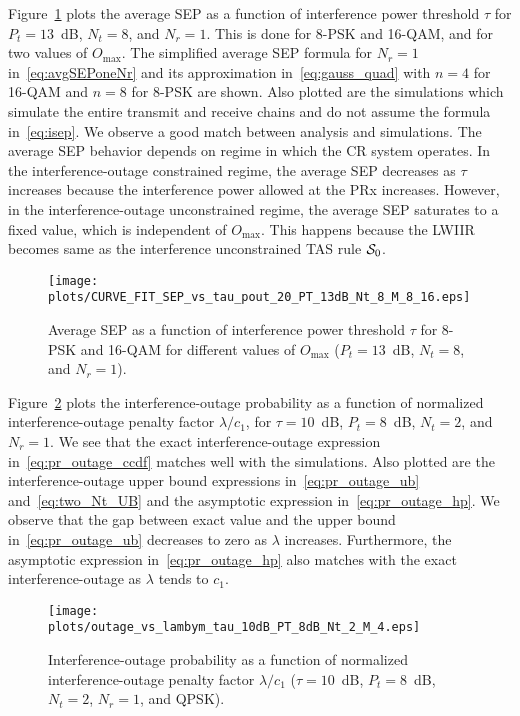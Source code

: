 \documentclass[12pt,draftcls,peerreview,onecolumn]{IEEEtran}
\newcommand{\lam}{\lambda}
\newcommand{\Nt}{{N_t}}
\newcommand{\Nr}{{N_r}}
\newcommand{\Pt}{{P_t}}
\newcommand{\outmax}{O_{\text{max}}}
\newcommand{\itau}{\tau}
\newcommand{\cone}{c_{1}}
\newcommand{\m}{\cone}
\newcommand{\caluncons}{{\cal S_{\text{0}}}}
\begin{document}
Figure~\ref{fig:SEP_vs_tau_QAM} plots the average SEP as a function of interference power threshold $\tau$ for $\Pt = 13$~dB, $\Nt=8$, and $\Nr=1$. This is done for 8-PSK and 16-QAM, and for two values of $\outmax$. The simplified average SEP formula for $\Nr=1$ in~\eqref{eq:avgSEPoneNr} and its approximation in~\eqref{eq:gauss_quad} with $n = 4$ for 16-QAM and $n=8$ for 8-PSK  are shown. Also plotted are the simulations which simulate the entire transmit and receive chains and do not assume the formula in~\eqref{eq:isep}. We observe a good match between analysis and simulations. The average SEP behavior depends on regime in which the CR system operates. In the interference-outage constrained regime, the average SEP decreases as $\itau$ increases because the interference power allowed at the PRx increases. However, in the interference-outage unconstrained regime, the average SEP saturates to a fixed value, which is independent of $\outmax$. This happens because the LWIIR becomes same as the interference unconstrained TAS rule $\caluncons$. %

\begin{figure}
	\centering \texttt{[image: plots/CURVE\_FIT\_SEP\_vs\_tau\_pout\_20\_PT\_13dB\_Nt\_8\_M\_8\_16.eps]}
	\caption{Average SEP as a function of interference power threshold $\itau$ for 8-PSK and 16-QAM for different values of $\outmax$ ($\Pt = 13$~dB, $\Nt=8$, and $\Nr=1$).}
	\label{fig:SEP_vs_tau_QAM}
\end{figure}



Figure~\ref{fig:outage_vs_lambym} plots the interference-outage probability as a function of normalized interference-outage penalty factor $\lam/\cone$,  for $\itau = 10$~dB, $\Pt = 8$~dB, $\Nt = 2$, and $\Nr=1$.  We see that the exact interference-outage expression in~\eqref{eq:pr_outage_ccdf} matches well with the simulations. Also plotted are the interference-outage upper bound expressions in~\eqref{eq:pr_outage_ub} and~\eqref{eq:two_Nt_UB} and the asymptotic expression in~\eqref{eq:pr_outage_hp}. We observe that the gap between exact value and the upper bound in~\eqref{eq:pr_outage_ub} decreases to zero as $\lam$ increases. Furthermore, the asymptotic expression in~\eqref{eq:pr_outage_hp} also matches with the exact interference-outage as $\lam$  tends to $\cone$.

\begin{figure}
  \centering \texttt{[image: plots/outage\_vs\_lambym\_tau\_10dB\_PT\_8dB\_Nt\_2\_M\_4.eps]}
  \caption{Interference-outage probability as a function of normalized interference-outage penalty factor $\lam/\m$ ($\itau = 10$~dB, $\Pt = 8$~dB, $\Nt = 2$, $\Nr=1$, and QPSK).}
\label{fig:outage_vs_lambym}
\end{figure}
\end{document}
